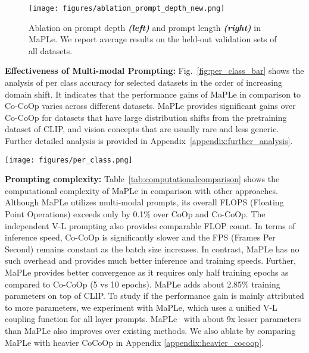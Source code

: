 \documentclass[10pt,twocolumn,letterpaper]{article}
\begin{document}
\begin{figure}[!b]
\texttt{[image: figures/ablation\_prompt\_depth\_new.png]}
\caption{\small Ablation on prompt depth  \emph{\textbf{(left)}} and prompt length \emph{\textbf{(right)}} in MaPLe. We report average results on the held-out validation sets of all datasets.}
  \label{fig:ablation1}
\end{figure}

\noindent\textbf{Effectiveness of Multi-modal Prompting:}
Fig.~\ref{fig:per_class_bar} shows the analysis of per class accuracy for selected datasets in the order of increasing domain shift. It indicates that the performance gains of MaPLe in comparison to Co-CoOp varies across different datasets. MaPLe provides significant gains over Co-CoOp for datasets that have large distribution shifts from the pretraining dataset of CLIP, and vision concepts that are usually rare and less generic. Further detailed analysis is provided in Appendix~\ref{appendix:further_analysis}.

\begin{SCfigure}[][!t]
\centering
    \texttt{[image: figures/per\_class.png]}
  \caption{\protect \small Percentage classes where MaPLe shows improved performance over Co-CoOp, which increases as dataset domain shift from generic categories increases ($\rightarrow$).}
  \label{fig:per_class_bar}
  \vspace{-0.1in}
\end{SCfigure}

\noindent \textbf{Prompting complexity:}
Table~\ref{tab:computationalcomparison} shows the computational complexity of MaPLe in comparison with other approaches. Although MaPLe utilizes multi-modal prompts, its overall FLOPS (Floating Point Operations) exceeds only by 0.1\% over CoOp and Co-CoOp. The independent V-L prompting also provides comparable FLOP count. In terms of inference speed, Co-CoOp is significantly slower and the FPS (Frames Per Second) remains constant as the batch size increases. In contrast, MaPLe has no such overhead and provides much better inference and training speeds. Further, MaPLe provides better convergence as it requires only half training epochs as compared to Co-CoOp (5 vs 10 epochs). MaPLe adds about 2.85\% training parameters on top of CLIP. To study if the performance gain is mainly attributed to more parameters, we experiment with MaPLe\dag, which uses a unified V-L coupling function for all layer prompts. MaPLe\dag~ with about 9x lesser parameters than MaPLe also improves over existing methods. We also ablate by comparing MaPLe with heavier CoCoOp in Appendix \ref{appendix:heavier_cocoop}.
\end{document}
